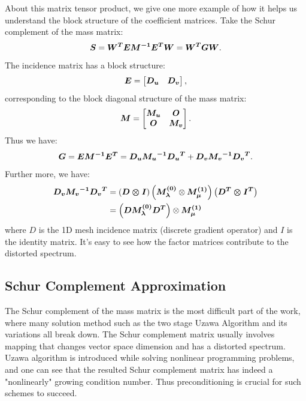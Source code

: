 About this matrix tensor product, we give one more example of how it helps us understand the block structure of the coefficient matrices. Take the Schur complement of the mass matrix:
\begin{equation}
	\boldsymbol{S} = \boldsymbol{W^T E M^{-1} E^T W} = \boldsymbol{W^T G W}.
\end{equation}      
The incidence matrix has a block structure: 
\begin{equation}
	\boldsymbol{E} = \begin{bmatrix}
		\boldsymbol{D_u} & \boldsymbol{D_v} 
	\end{bmatrix},
\end{equation}
corresponding to the block diagonal structure of the mass matrix:
\begin{equation}
	\boldsymbol{M} = \begin{bmatrix}
		\boldsymbol{M_u} & \boldsymbol{O} \\
		\boldsymbol{O} & \boldsymbol{M_v}
	\end{bmatrix}.
\end{equation}
Thus we have: 
\begin{equation}
	\boldsymbol{G} = \boldsymbol{E M^{-1} E^T} = \boldsymbol{D_u {M_u}^{-1} {D_u}^T} + \boldsymbol{D_v {M_v}^{-1} {D_v}^T} .
\end{equation}
Further more, we have:
\begin{equation}\label{eqn:Schur}
\begin{split}
	\boldsymbol{D_v {M_v}^{-1} {D_v}^T}  &= \left(\boldsymbol{D \otimes I} \right)\left(\boldsymbol{M_{\lambda}^{(0)}} \otimes \boldsymbol{M_{\mu}^{(1)}} \right) \left(\boldsymbol{D^T \otimes I^T} \right) \\
	&= \left(\boldsymbol{D M_{\lambda}^{(0)} D^T} \right) \otimes \boldsymbol{M_{\mu}^{(1)}}
\end{split}
\end{equation}
where $D$ is the 1D mesh incidence matrix (discrete gradient operator) and $I$ is the identity matrix. It's easy to see how the factor matrices contribute to the distorted spectrum. \\  

\subsection{Schur Complement Approximation}   
The Schur complement of the mass matrix is the most difficult part of the work, where many solution method such as the two stage Uzawa Algorithm and its variations all break down. The Schur complement matrix usually involves mapping that changes vector space dimension and has a distorted spectrum. Uzawa algorithm is introduced while solving nonlinear programming problems, and one can see that the resulted Schur complement matrix has indeed a "nonlinearly" growing condition number. Thus preconditioning is crucial for such schemes to succeed.  \\  

